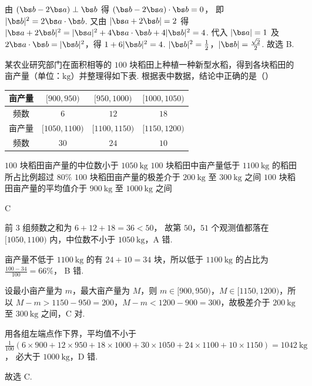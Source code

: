 \begin{solution}
由 \((\bs b-2\bs a)\perp \bs b\) 得
\((\bs b-2\bs a)\cdot \bs b=0\)，
即
\(|\bs b|^2=2\bs a\cdot \bs b\).
又由 \(|\bs a+2\bs b|=2\) 得
\(|\bs a+2\bs b|^2=|\bs a|^2+4\bs a\cdot \bs b+4|\bs b|^2=4\).
代入 \(|\bs a|=1\) 及 \(2\bs a\cdot \bs b=|\bs b|^2\)，得
\(1+6|\bs b|^2=4\).
\(|\bs b|^2=\frac12\)，\(|\bs b|=\frac{\sqrt2}{2}\).
故选 B.
\end{solution}

\begin{problem}
某农业研究部门在面积相等的 \(100\text{ 块}\)稻田上种植一种新型水稻，得到各块稻田的亩产量（单位：\(\mathrm{kg}\)）并整理得如下表. 根据表中数据，结论中正确的是（\quad）

\begin{center}
\begin{tabular}{|c|c|c|c|}
\hline
亩产量 & \([900,950)\) & \([950,1000)\) & \([1000,1050)\) \\
\hline
频数 & \(6\) & \(12\) & \(18\) \\
\hline
亩产量 & \([1050,1100)\) & \([1100,1150)\) & \([1150,1200)\) \\
\hline
频数 & \(30\) & \(24\) & \(10\) \\
\hline
\end{tabular}
\end{center}

\choices
    {\(100\text{ 块}\)稻田亩产量的中位数小于 \(1050 \mathrm{~kg}\)}
    {\(100\text{ 块}\)稻田中亩产量低于 \(1100 \mathrm{~kg}\) 的稻田所占比例超过 \(80\%\)}
    {\(100\text{ 块}\)稻田亩产量的极差介于 \(200 \mathrm{~kg}\) 至 \(300 \mathrm{~kg}\) 之间}
    {\(100\text{ 块}\)稻田亩产量的平均值介于 \(900 \mathrm{~kg}\) 至 \(1000 \mathrm{~kg}\) 之间}
\end{problem}

\begin{answer}
C
\end{answer}

\begin{solution}
前 3 组频数之和为
\(6+12+18=36<50\)，
故第 \(50\)，\(51\) 个观测值都落在 \([1050,1100)\) 内，中位数不小于 \(1050 \mathrm{~kg}\)，A 错.

亩产量不低于 \(1100 \mathrm{~kg}\) 的有 \(24+10=34\) 块，所以低于 \(1100 \mathrm{~kg}\) 的占比为
\(\frac{100-34}{100}=66\%\)，
B 错.

设最小亩产量为 \(m\)，最大亩产量为 \(M\)，则 \(m\in[900,950)\)，\(M\in[1150,1200)\)，所以 \(M-m>1150-950=200\)，\(M-m<1200-900=300\)，故极差介于 \(200 \mathrm{~kg}\) 至 \(300 \mathrm{~kg}\) 之间，C 对.

用各组左端点作下界，平均值不小于
\(\frac{1}{100}\left(6\times 900+12\times 950+18\times 1000+30\times 1050+24\times 1100+10\times 1150\right)=1042 \mathrm{~kg}\)，
必大于 \(1000 \mathrm{~kg}\)，D 错.

故选 C.
\end{solution}

